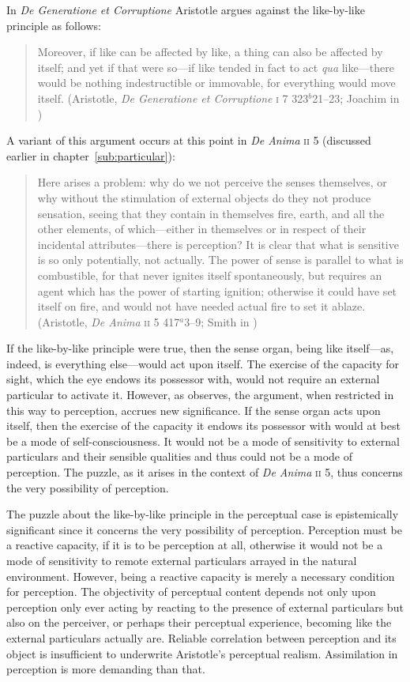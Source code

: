 In \emph{De Generatione et Corruptione} Aristotle argues against the like-by-like principle as follows:
\begin{quote}
	Moreover, if like can be affected by like, a thing can also be affected by itself; and yet if that were so---if like tended in fact to act \emph{qua} like---there would be nothing indestructible or immovable, for everything would move itself. (Aristotle, \emph{De Generatione et Corruptione} \textsc{i} 7 323\( ^{b} \)21--23; Joachim in \citealt[23]{Barnes:1984uq})
\end{quote}
A variant of this argument occurs at this point in \emph{De Anima} \textsc{ii} 5 (discussed earlier in chapter~\ref{sub:particular}): 
\begin{quote}
	Here arises a problem: why do we not perceive the senses themselves, or why without the stimulation of external objects do they not produce sensation, seeing that they contain in themselves fire, earth, and all the other elements, of which---either in themselves or in respect of their incidental attributes---there is perception? It is clear that what is sensitive is so only potentially, not actually. The power of sense is parallel to what is combustible, for that never ignites itself spontaneously, but requires an agent which has the power of starting ignition; otherwise it could have set itself on fire, and would not have needed actual fire to set it ablaze. (Aristotle, \emph{De Anima} \textsc{ii} 5 417\( ^{a} \)3--9; Smith in \citealt[29]{Barnes:1984uq})
\end{quote}
If the like-by-like principle were true, then the sense organ, being like itself---as, indeed, is everything else---would act upon itself. The exercise of the capacity for sight, which the eye endows its possessor with, would not require an external particular to activate it. However, as \citet[226--227]{Polansky:2007ly} observes, the argument, when restricted in this way to perception, accrues new significance. If the sense organ acts upon itself, then the exercise of the capacity it endows its possessor with would at best be a mode of self-consciousness. It would not be a mode of sensitivity to external particulars and their sensible qualities and thus could not be a mode of perception. The puzzle, as it arises in the context of \emph{De Anima} \textsc{ii} 5, thus concerns the very possibility of perception.

The puzzle about the like-by-like principle in the perceptual case is epistemically significant since it concerns the very possibility of perception. Perception must be a reactive capacity, if it is to be perception at all, otherwise it would not be a mode of sensitivity to remote external particulars arrayed in the natural environment. However, being a reactive capacity is merely a necessary condition for perception. The objectivity of perceptual content depends not only upon perception only ever acting by reacting to the presence of external particulars but also on the perceiver, or perhaps their perceptual experience, becoming like the external particulars actually are. Reliable correlation between perception and its object is insufficient to underwrite Aristotle's perceptual realism. Assimilation in perception is more demanding than that.

